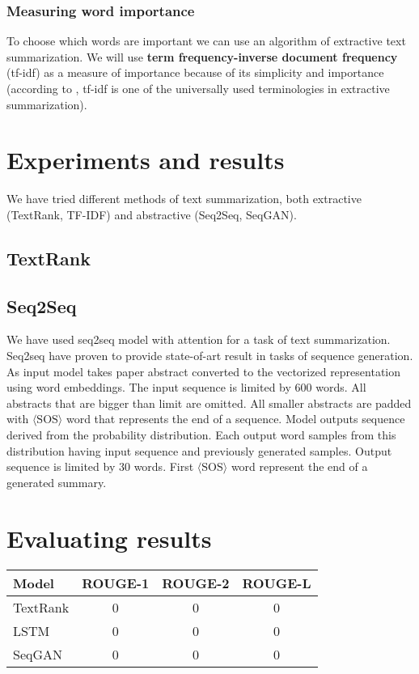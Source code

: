 \documentclass[sigplan]{acmart}
\begin{document}
\subsubsection{Measuring word importance}
\label{sec:importance}

To choose which words are important we can use an algorithm of extractive text summarization. We will use \textbf{term frequency-inverse document frequency} (tf-idf) as a measure of importance because of its simplicity and importance (according to \cite{kumar-16}, tf-idf is one of the universally used terminologies in extractive summarization).

\section{Experiments and results}

We have tried different methods of text summarization, both extractive (TextRank, TF-IDF) and abstractive (Seq2Seq, SeqGAN).

\subsection{TextRank}
\subsection{Seq2Seq}
We have used seq2seq model with attention for a task of text summarization. Seq2seq have proven to provide state-of-art result in tasks of sequence generation.
As input model takes paper abstract converted to the vectorized representation using word embeddings.  The input sequence is limited by 600 words. All abstracts that are bigger than limit are omitted. All smaller abstracts are padded with $\langle\text{SOS}\rangle$ word that represents the end of a sequence.
Model outputs sequence derived from the probability distribution. Each output word samples from this distribution having input sequence and previously generated samples. Output sequence is limited by 30 words. First $\langle\text{SOS}\rangle$ word represent the end of a generated summary.


\section{Evaluating results}

\begin{tabular}{|l|c|c|c|}
\hline
\textbf{Model} & \textbf{ROUGE-1} & \textbf{ROUGE-2} & \textbf{ROUGE-L} \\
\hline
TextRank & 0 & 0 & 0 \\
LSTM & 0 & 0 & 0 \\
SeqGAN & 0 & 0 & 0 \\
\hline
\end{tabular}
\end{document}
